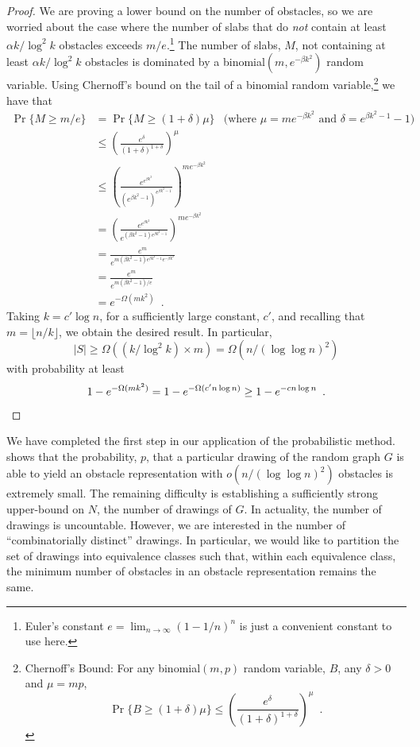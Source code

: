 \documentclass{patmorin}
\begin{document}
\begin{proof}
We are proving a lower bound on the number of obstacles, so we are
worried about the case where the number of slabs that do \emph{not}
contain at least $\alpha k/\log^2 k$ obstacles exceeds $m/e$.\footnote{Euler's constant $e=\lim_{n\rightarrow \infty} (1-1/n)^n$ is just a convenient
constant to use here.}
The number of slabs, $M$, not containing at least $\alpha k/\log^2 k$
obstacles is dominated by a binomial$(m,e^{-\beta k^2})$ random
variable.
Using Chernoff's bound on the tail of a binomial random
variable,\footnote{%
  Chernoff's Bound: For any binomial$(m,p)$ random variable, $B$,
  any $\delta>0$ and $\mu=mp$, 
  \[ \Pr\{B\ge (1+\delta)\mu\}
     \le \left(\frac{e^{\delta}}{(1+\delta)^{1+\delta}}\right)^{\mu} 
       \enspace . 
  \]}
we have that
\begin{align*}
  \Pr\{M \ge m/e\} & = \Pr\{M\ge (1+\delta)\mu\}
    & \text{(where $\mu=me^{-\beta k^2}$ and $\delta=e^{\beta k^2-1}-1$)} \\
    & \le \left(\frac{e^{\delta}}{(1+\delta)^{1+\delta}}\right)^{\mu} \\
    & \le \left(\frac{e^{e^{\beta k^2}}}{(e^{\beta k^2-1})^{e^{\beta k^2-1}}}\right)^{me^{-\beta k^2}}\\
    & = \left(\frac{e^{e^{\beta k^2}}}{e^{(\beta k^2-1)e^{\beta k^2-1}}}\right)^{me^{-\beta k^2}}\\
    & = \frac{e^{m}}{e^{m(\beta k^2-1)e^{\beta k^2-1}e^{-\beta k^2}}} \\
    & = \frac{e^{m}}{e^{m(\beta k^2-1)/e}} \\
    & = e^{-\Omega(mk^2)} \enspace .
\end{align*}
Taking $k=c'\log n$, for a sufficiently large constant, $c'$, and recalling that $m=\lfloor n/k\rfloor$, we obtain
the desired result.  In particular,
\[
    |S| \ge \Omega\left(\left(k/\log^2 k\right)\times m \right)
      = \Omega\left(n/(\log\log n)^2\right)
\]
with probability at least
\[
    1-e^{-\Omega(mk^2)} = 1-e^{-\Omega(c'n\log n)} \ge 1-e^{-cn\log n} \enspace . \qedhere
\]
\end{proof}

We have completed the first step in our application of the probabilistic
method.   shows that the probability, $p$, that a
particular drawing of the random graph $G$ is able to yield an obstacle
representation with $o(n/(\log\log n)^2)$ obstacles is extremely small.
The remaining difficulty is establishing a sufficiently strong upper-bound
on $N$, the number of drawings of $G$. In actuality, the number of
drawings is uncountable.  However, we are interested in the number of
``combinatorially distinct'' drawings.  In particular, we would like
to partition the set of drawings into equivalence classes such that,
within each equivalence class, the minimum number of obstacles in an
obstacle representation remains the same.
\end{document}
